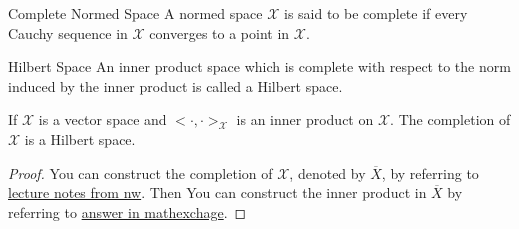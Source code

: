 \begin{definition}{Complete Normed Space}{}
    A normed space $\mathscr{X}$ is said to be complete if every Cauchy sequence in $\mathscr{X}$ converges to a point in $\mathscr{X}$.    
\end{definition}


\begin{definition}{Hilbert Space}{}
    An inner product space which is complete with respect to the norm induced by 
    the inner product is called a Hilbert space.
\end{definition}


\begin{proposition}{}{}
    If $\mathscr{X}$ is a vector space and $<\cdot,\cdot>_{\mathscr{X}}$ is an inner product on $\mathscr{X}$.
    The completion of $\mathscr{X}$ is a Hilbert space. 
\end{proposition}
\begin{proof}
    You can construct the completion of $\mathscr{X}$, denoted by $\overline{X}$, by referring to \href{https://sites.math.northwestern.edu/~scanez/courses/320/notes/completion.pdf}{lecture notes from nw}. 
    Then You can construct the inner product in $\overline{X}$ by referring to \href{https://math.stackexchange.com/questions/1234209/if-x-is-an-inner-product-space-then-is-its-completion-a-hilbert-space}{answer in mathexchage}.
\end{proof}


